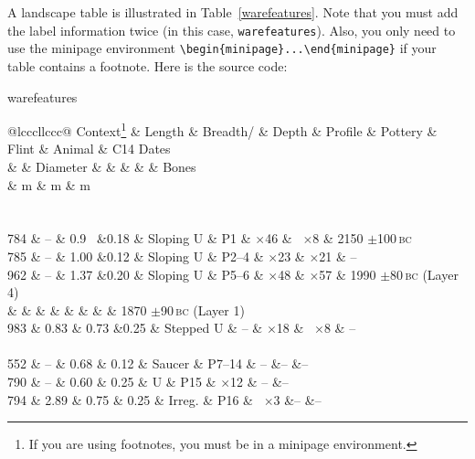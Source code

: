 A landscape table is illustrated in Table~\ref{warefeatures}. Note that you must add the label information twice (in this case, \verb"warefeatures"). Also, you only need to use the minipage environment \verb"\begin{minipage}...\end{minipage}" if your table contains a footnote. Here is the source code:
\begin{smallverbatim}
  \begin{table}{warefeatures}
    \caption[Landscape table]{Grooved ware and beaker features,
      their finds and radiocarbon dates. For a breakdown of the
      pottery assemblages see Tables~I and~III; for the flints see
      Tables~II and~IV; for the animal bones see Table~V.}
    \label{warefeatures}
    \begin{minipage}{440pt}%
    \begin{tabular}{@{}lcccllccc@{}}
    \hline\hline
    Context\footnote{If you are using footnotes, you must be in a minipage
      environment.}
    & Length & Breadth/ & Depth & Profile & Pottery & Flint
    & Animal & C14 Dates\\
    & & Diameter & & & & & Bones\\[5.5pt]
    & m & m & m\\
    \hline\\[-5.5pt]
    \\
    784 & -- & 0.9$\phantom{0}$ &0.18  & Sloping U & P1     & $\times$46
        & $\phantom{0}$$\times$8  & 2150 $\pm$100\,\textsc{bc}\\
    785 & -- & 1.00             &0.12  & Sloping U & P2--4  & $\times$23
        & $\times$21 & --\\
    962 & -- & 1.37             &0.20  & Sloping U & P5--6  & $\times$48
        & $\times$57 &  1990 $\pm$80\,\textsc{bc} (Layer 4)\\
    & & & & & & & & 1870 $\pm$90\,\textsc{bc} (Layer 1)\\
    983 & 0.83     & 0.73       &0.25  & Stepped U & --     & $\times$18
    & $\phantom{0}$$\times$8  & --\\[\baselineskip]
    \\
    552 & -- & 0.68             & 0.12 & Saucer    & P7--14 & --
        &-- &--\\
    790 & -- & 0.60             & 0.25 & U         & P15    & $\times$12
        & --   &--\\
    794 & 2.89                  & 0.75 & 0.25      & Irreg. & P16
        & $\phantom{0}$$\times$3  &-- &--\\
    \hline\hline
    \end{tabular}
    \end{minipage}
  \end{table}
\end{smallverbatim}

